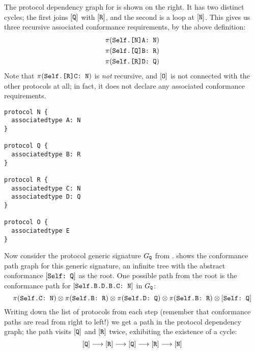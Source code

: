 \documentclass[../generics]{subfiles}
\begin{document}
\smallskip

\begin{wrapfigure}[11]{l}{4.5cm}
\end{wrapfigure}
The protocol dependency graph for  is shown on the right. It has two distinct cycles; the first joins $[\texttt{Q}]$ with $[\texttt{R}]$, and the second is a loop at $[\texttt{N}]$. This gives us three recursive associated conformance requirements, by the above definition:
\begin{gather*}
\pi(\texttt{Self.[N]A:~N})\\
\pi(\texttt{Self.[Q]B:~R})\\
\pi(\texttt{Self.[R]D:~Q})
\end{gather*}
Note that $\pi(\texttt{Self.[R]C:~N})$ is \emph{not} recursive, and $[\texttt{O}]$ is not connected with the other protocols at all; in fact, it does not declare any associated conformance requirements.

\smallskip

\begin{listing}\label{protocol dependency graph listing}
\begin{Verbatim}
protocol N {
  associatedtype A: N
}

protocol Q {
  associatedtype B: R
}

protocol R {
  associatedtype C: N
  associatedtype D: Q
}

protocol O {
  associatedtype E
}
\end{Verbatim}
\end{listing}

Now consider the protocol generic signature $G_{\texttt{Q}}$ from .  shows the conformance path graph for this generic signature, an infinite tree with the abstract conformance $[\texttt{Self:~Q}]$ as the root. One possible path from the root is the conformance path for $[\texttt{Self.B.D.B.C:~N}]$ in $G_{\texttt{Q}}$:
\[
\pi(\texttt{Self.C:~N}) \otimes \pi(\texttt{Self.B:~R}) \otimes \pi(\texttt{Self.D:~Q}) \otimes \pi(\texttt{Self.B:~R}) \otimes [\texttt{Self:~Q}]
\]
Writing down the list of protocols from each step (remember that conformance paths are read from right to left!) we get a path in the protocol dependency graph; the path visits $[\texttt{Q}]$ and $[\texttt{R}]$ twice, exhibiting the existence of a cycle:
\[[\texttt{Q}]\longrightarrow[\texttt{R}]\longrightarrow[\texttt{Q}]\longrightarrow[\texttt{R}]\longrightarrow[\texttt{N}]\]
\end{document}
